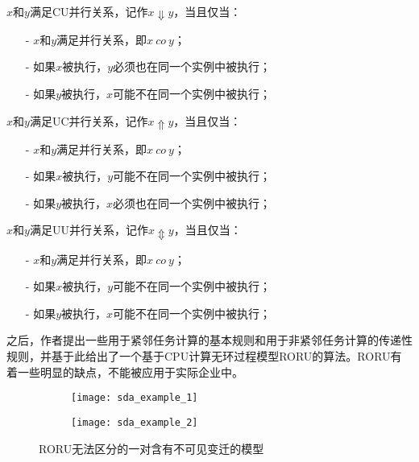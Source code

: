 \begin{definition}\label{def:c_u_concurrency}
$x$和$y$满足CU并行关系，记作$x\Downarrow y$，当且仅当：
  \begin{itemize}
    \item[-] $x$和$y$满足并行关系，即$x~co~y$；
    \item[-] 如果$x$被执行，$y$必须也在同一个实例中被执行；
    \item[-] 如果$y$被执行，$x$可能不在同一个实例中被执行；
  \end{itemize}
\end{definition}

\begin{definition}\label{def:u_c_concurrency}
$x$和$y$满足UC并行关系，记作$x\Uparrow y$，当且仅当：
  \begin{itemize}
    \item[-] $x$和$y$满足并行关系，即$x~co~y$；
    \item[-] 如果$x$被执行，$y$可能不在同一个实例中被执行；
    \item[-] 如果$y$被执行，$x$必须也在同一个实例中被执行；
  \end{itemize}
\end{definition}

\begin{definition}\label{def:u_u_concurrency}
$x$和$y$满足UU并行关系，记作$x\Updownarrow y$，当且仅当：
  \begin{itemize}
    \item[-] $x$和$y$满足并行关系，即$x~co~y$；
    \item[-] 如果$x$被执行，$y$可能不在同一个实例中被执行；
    \item[-] 如果$y$被执行，$x$可能不在同一个实例中被执行；
  \end{itemize}
\end{definition}

之后，作者提出一些用于紧邻任务计算的基本规则和用于非紧邻任务计算的传递性规则，并基于此给出了一个基于CPU计算无环过程模型RORU的算法。RORU有着一些明显的缺点，不能被应用于实际企业中。

\begin{figure}[htbp]
  \centering
  \begin{subfigure}{1\textwidth}
    \centering
    \texttt{[image: sda\_example\_1]}
    \caption{\label{fig:sda_example_1}}
  \end{subfigure}
  \begin{subfigure}{1\textwidth}
    \vspace{1em}
    \centering
    \texttt{[image: sda\_example\_2]}
    \caption{\label{fig:sda_example_2}}
  \end{subfigure}
  \caption{RORU无法区分的一对含有不可见变迁的模型}
  \label{fig:sda_example}
\end{figure}

